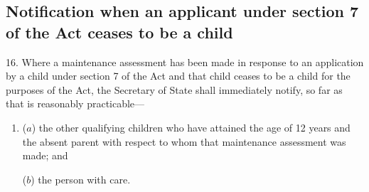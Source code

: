 \documentclass[a4paper,12pt]{article}
\begin{document}
%
%
%

\subsection[16. Notification when an applicant under section 7 of the Act ceases to be a child]{\sloppy Notification when an applicant under section 7 of the Act ceases to be a child}

16.  Where a maintenance assessment has been made in response to an application by a child under section 7 of the Act and that child ceases to be a child for the purposes of the Act, 
the Secretary of State  %
shall immediately notify, so far as that is reasonably practicable—
\begin{enumerate}\item[]
($a$) the other qualifying children 
who have attained the age of 12 years %
and the absent parent with respect to whom that maintenance assessment was made; and

($b$) the person with care.
\end{enumerate}


%
%
\end{document}
